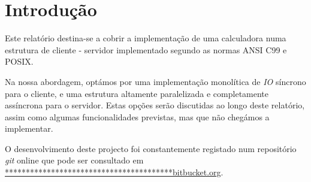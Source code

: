 \section{Introdução\label{sec:Introducao}}

	\indent\indent Este relatório destina-se a cobrir a implementação de uma calculadora numa estrutura de cliente - servidor implementado segundo as normas ANSI C99 e POSIX.
	
	Na nossa abordagem, optámos por uma implementação monolítica de \emph{IO} síncrono para o cliente, e uma estrutura altamente paralelizada e completamente assíncrona para o servidor.
	Estas opções serão discutidas ao longo deste relatório, assim como algumas funcionalidades previstas, mas que não chegámos a implementar.
	
	O desenvolvimento deste projecto foi constantemente registado num repositório \emph{git} online que pode ser consultado em \href{http://www.google.com}{****************************************bitbucket.org}.

\clearpage